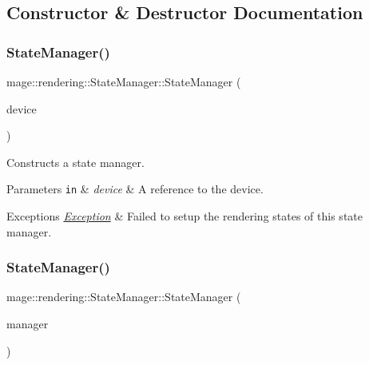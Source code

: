 \subsection{Constructor \& Destructor Documentation}
\hypertarget{classmage_1_1rendering_1_1_state_manager_ae19649b2bfc0fc7eb3110fb85cda26b7}{}\label{classmage_1_1rendering_1_1_state_manager_ae19649b2bfc0fc7eb3110fb85cda26b7} 
\subsubsection{\texorpdfstring{State\+Manager()}{StateManager()}\hspace{0.1cm}{\footnotesize\ttfamily [1/3]}}
{\footnotesize\ttfamily mage\+::rendering\+::\+State\+Manager\+::\+State\+Manager (\begin{DoxyParamCaption}\item[{I\+D3\+D11\+Device \&}]{device }\end{DoxyParamCaption})\hspace{0.3cm}{\ttfamily [explicit]}}

Constructs a state manager.


\begin{DoxyParams}[1]{Parameters}
\mbox{\tt in}  & {\em device} & A reference to the device. \\
\hline
\end{DoxyParams}

\begin{DoxyExceptions}{Exceptions}
{\em \hyperlink{classmage_1_1_exception}{Exception}} & Failed to setup the rendering states of this state manager. \\
\hline
\end{DoxyExceptions}
\hypertarget{classmage_1_1rendering_1_1_state_manager_aa5e404cde4e010a5738815d1d4938585}{}\label{classmage_1_1rendering_1_1_state_manager_aa5e404cde4e010a5738815d1d4938585} 
\subsubsection{\texorpdfstring{State\+Manager()}{StateManager()}\hspace{0.1cm}{\footnotesize\ttfamily [2/3]}}
{\footnotesize\ttfamily mage\+::rendering\+::\+State\+Manager\+::\+State\+Manager (\begin{DoxyParamCaption}\item[{const \hyperlink{classmage_1_1rendering_1_1_state_manager}{State\+Manager} \&}]{manager }\end{DoxyParamCaption})\hspace{0.3cm}{\ttfamily [delete]}}

